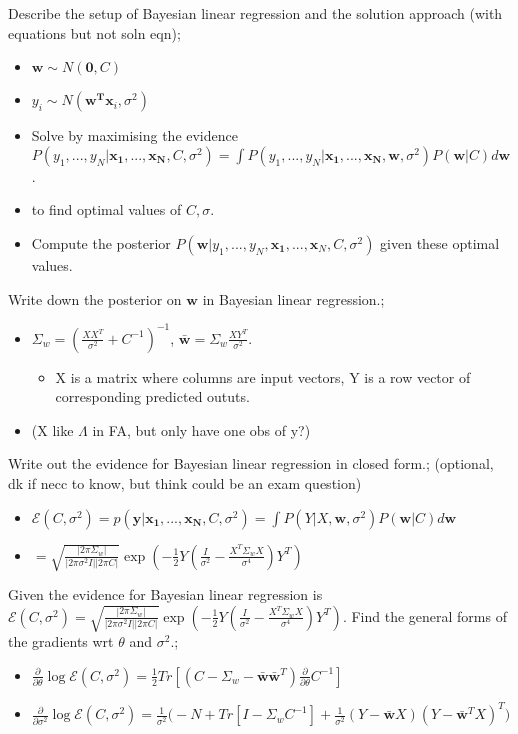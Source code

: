 \documentclass{article}
\begin{document}

Describe the setup of Bayesian linear regression and the solution approach (with equations but not soln eqn); \begin{itemize} \item $\mathbf{w}\sim N(\mathbf{0}, C)$ \item $y_i\sim N(\mathbf{w^Tx}_i, \sigma^2)$ \item Solve by maximising the evidence $P(y_1,...,y_N|\mathbf{x_1,...,x_N}, C, \sigma^2)=\int P(y_1,...,y_N|\mathbf{x_1,...,x_N,w}, \sigma^2)P(\mathbf{w}|C)d\mathbf{w}$.  \item to find optimal values of $C, \sigma$.  \item Compute the posterior $P(\mathbf{w}|y_1,...,y_N,\mathbf{x_1},...,\mathbf{x}_N, C, \sigma^2)$ given these optimal values.  \end{itemize}

Write down the posterior on $\mathbf{w}$ in Bayesian linear regression.; \begin{itemize} \item $\Sigma_w = (\frac{XX^T}{\sigma^2}+C^{-1})^{-1}$, $\mathbf{\bar{w}}=\Sigma_w\frac{XY^T}{\sigma^2}$.  \begin{itemize} \item X is a matrix where columns are input vectors, Y is a row vector of corresponding predicted oututs.  \end{itemize} \item (X like $\Lambda$ in FA, but only have one obs of y?) \end{itemize}

Write out the evidence for Bayesian linear regression in closed form.; (optional, dk if necc to know, but think could be an exam question) \begin{itemize} \item $\mathcal{E}(C,\sigma^2)=p(\mathbf{y|x_1,...,x_N}, C, \sigma^2)=\int P(Y|X, \mathbf{w}, \sigma^2)P(\mathbf{w}|C)d\mathbf{w}$ \item $=\sqrt{\frac{|2\pi\Sigma_w|}{|2\pi\sigma^2I||2\pi C|}}\exp(-\frac{1}{2}Y(\frac{I}{\sigma^2}-\frac{X^T\Sigma_w X}{\sigma^4})Y^T)$ \end{itemize}

Given the evidence for Bayesian linear regression is $\mathcal{E}(C,\sigma^2)=\sqrt{\frac{|2\pi\Sigma_w|}{|2\pi\sigma^2I||2\pi C|}}\exp(-\frac{1}{2}Y(\frac{I}{\sigma^2}-\frac{X^T\Sigma_w X}{\sigma^4})Y^T)$. Find the general forms of the gradients wrt $\theta$ and $\sigma^2$.; \begin{itemize} \item $\frac{\partial}{\partial\theta}\log\mathcal{E}(C,\sigma^2)=\frac{1}{2}Tr[(C-\Sigma_w-\mathbf{\bar{w}\bar{w}}^T)\frac{\partial}{\partial\theta}C^{-1}]$ \item $\frac{\partial}{\partial\sigma^2}\log\mathcal{E}(C,\sigma^2)=\frac{1}{\sigma^2}\big(-N+Tr[I-\Sigma_wC^{-1}]+\frac{1}{\sigma^2}(Y-\mathbf{\bar{w}}X)(Y-\mathbf{\bar{w}}^TX)^T\big )$ \end{itemize}
\end{document}

